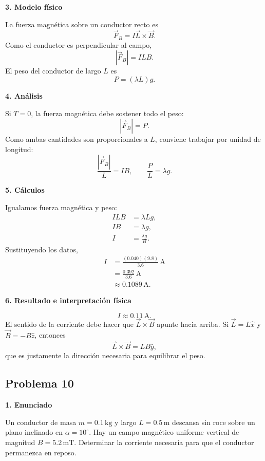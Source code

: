 \documentclass[11pt]{article}
\newcommand{\paso}[1]{%
  \par\medskip
  \noindent\textbf{#1}\par
  \vspace{0.1em}%
}
\begin{document}
\paso{3. Modelo f\'isico}
La fuerza magn\'etica sobre un conductor recto es
\begin{equation*}
    \vec F_B=I\vec L\times\vec B.
\end{equation*}
Como el conductor es perpendicular al campo,
\begin{equation*}
    |\vec F_B|=ILB.
\end{equation*}
El peso del conductor de largo $L$ es
\begin{equation*}
    P=(\lambda L)g.
\end{equation*}

\paso{4. An\'alisis}
Si $T=0$, la fuerza magn\'etica debe sostener todo el peso:
\begin{equation*}
    |\vec F_B|=P.
\end{equation*}
Como ambas cantidades son proporcionales a $L$, conviene trabajar por unidad de longitud:
\begin{equation*}
    \frac{|\vec F_B|}{L}=IB,
    \qquad
    \frac{P}{L}=\lambda g.
\end{equation*}

\paso{5. C\'alculos}
Igualamos fuerza magn\'etica y peso:
\begin{align*}
    ILB&=\lambda Lg,\\
    IB&=\lambda g,\\
    I&=\frac{\lambda g}{B}.
\end{align*}
Sustituyendo los datos,
\begin{align*}
    I&=\frac{(0.040)(9.8)}{3.6}\,\mathrm A\\
     &=\frac{0.392}{3.6}\,\mathrm A\\
     &\approx0.1089\,\mathrm A.
\end{align*}

\paso{6. Resultado e interpretaci\'on f\'isica}
\begin{equation*}
    \boxed{I\approx0.11\,\mathrm A}.
\end{equation*}
El sentido de la corriente debe hacer que $\vec L\times\vec B$ apunte hacia arriba. Si $\vec L=L\hat x$ y $\vec B=-B\hat z$, entonces
\begin{equation*}
    \vec L\times\vec B=LB\hat y,
\end{equation*}
que es justamente la direcci\'on necesaria para equilibrar el peso.

\newpage

\subsection*{Problema 10}
\paso{1. Enunciado}
Un conductor de masa $m=0.1\,\mathrm{kg}$ y largo $L=0.5\,\mathrm m$ descansa sin roce sobre un plano inclinado en $\alpha=10^\circ$. Hay un campo magn\'etico uniforme vertical de magnitud $B=5.2\,\mathrm{mT}$. Determinar la corriente necesaria para que el conductor permanezca en reposo.
\end{document}
